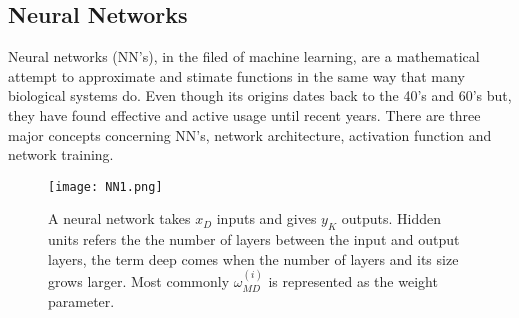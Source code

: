 \subsection{Neural Networks}
Neural networks (NN's), in the filed of machine learning, are a mathematical attempt to approximate and stimate functions in the same way that many biological systems do. Even though its origins dates back to the 40's and 60's but, they have found effective and active usage until recent years. There are three major concepts concerning NN's, network architecture, activation function and network training.
\begin{figure}[tb] 
\centering 
\texttt{[image: NN1.png]} 
\caption[Neural network example architecture]{A neural network takes $x_D$ inputs and gives $y_K$ outputs. Hidden units refers the the number of layers between the input and output layers, the term deep comes when the number of layers and its size grows larger. Most commonly $\omega_{MD}^{(i)}$ is represented as the weight parameter.}
\label{fig:NNim1} 
\end{figure} 
